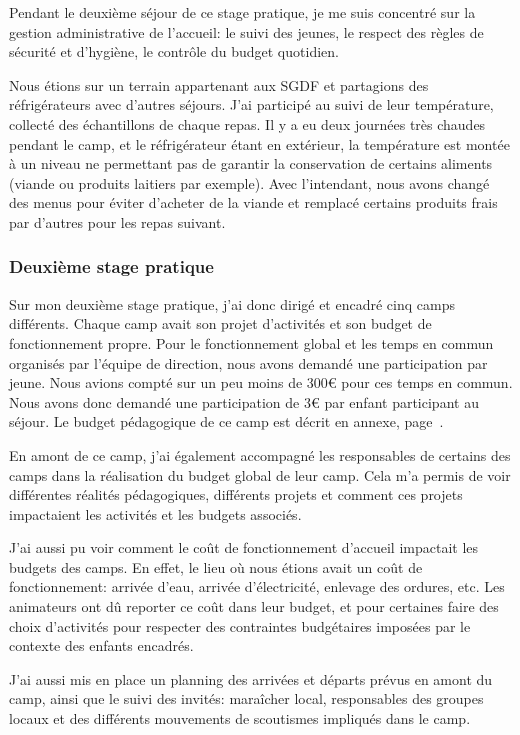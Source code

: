 \documentclass[titlepage,11pt,a4paper]{article}
\begin{document}
Pendant le deuxième séjour de ce stage pratique, je me suis concentré sur la gestion
administrative de l'accueil: le suivi des jeunes, le respect des règles de sécurité et
d'hygiène, le contrôle du budget quotidien.

Nous étions sur un terrain appartenant aux SGDF et partagions des réfrigérateurs avec
d'autres séjours. J'ai participé au suivi de leur température, collecté des échantillons de
chaque repas. Il y a eu deux journées très chaudes pendant le camp, et le réfrigérateur
étant en extérieur, la température est montée à un niveau ne permettant pas de garantir la
conservation de certains aliments (viande ou produits laitiers par exemple). Avec
l'intendant, nous avons changé des menus pour éviter d'acheter de la viande et remplacé
certains produits frais par d'autres pour les repas suivant.

\subsubsection{Deuxième stage pratique}


Sur mon deuxième stage pratique, j'ai donc dirigé et encadré cinq camps différents. Chaque camp avait son
projet d'activités et son budget de fonctionnement propre. Pour le fonctionnement global et les
temps en commun organisés par l'équipe de direction, nous avons demandé une participation
par jeune. Nous avions compté sur un peu moins de 300€ pour ces temps en commun. Nous
avons donc demandé une participation de 3€ par enfant participant au séjour. Le budget
pédagogique de ce camp est décrit en annexe, page~\pageref{budgped}.

En amont de ce camp, j'ai également accompagné les responsables de certains des camps dans
la réalisation du budget global de leur camp. Cela m'a permis de voir différentes
réalités pédagogiques, différents projets et comment ces projets impactaient les activités
et les budgets associés.

J'ai aussi pu voir comment le coût de fonctionnement d'accueil
impactait les budgets des camps. En effet, le lieu où nous étions avait un coût de
fonctionnement: arrivée d'eau, arrivée d'électricité, enlevage des ordures, etc. Les
animateurs ont dû reporter ce coût dans leur budget, et pour certaines faire des choix
d'activités pour respecter des contraintes budgétaires imposées par le contexte des
enfants encadrés.

J'ai aussi mis en place un planning des arrivées et départs prévus en amont du camp, ainsi
que le suivi des invités: maraîcher local, responsables des groupes locaux et des
différents mouvements de scoutismes impliqués dans le camp.
\end{document}
